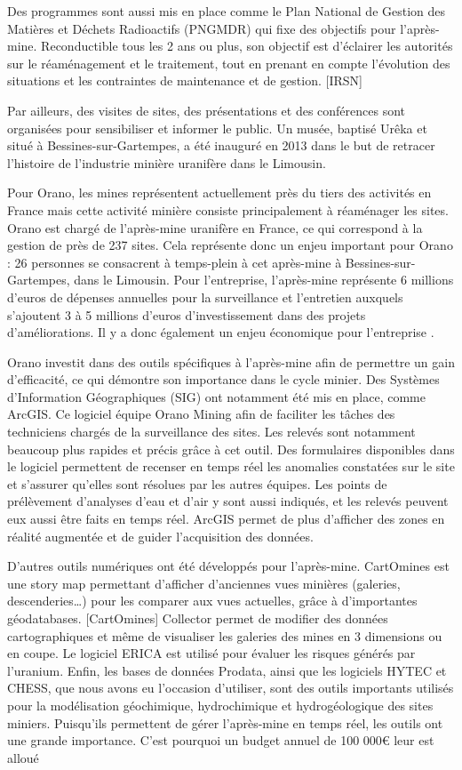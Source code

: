 \documentclass{article}
\begin{document}
Des programmes sont aussi mis en place comme le Plan National de Gestion des Matières et Déchets Radioactifs (PNGMDR) qui fixe des objectifs pour l’après-mine. Reconductible tous les 2 ans ou plus, son objectif est d’éclairer les autorités sur le réaménagement et le traitement, tout en prenant en compte l’évolution des situations et les contraintes de maintenance et de gestion.  [IRSN]

Par ailleurs, des visites de sites, des présentations et des conférences sont organisées pour sensibiliser et informer le public. Un musée, baptisé Urêka et situé à Bessines-sur-Gartempes, a été inauguré en 2013 dans le but de retracer l’histoire de l’industrie minière uranifère dans le Limousin.

Pour Orano, les mines représentent actuellement près du tiers des activités en France mais cette activité minière consiste principalement à réaménager les sites. Orano est chargé de l’après-mine uranifère en France, ce qui correspond à la gestion de près de 237 sites. Cela représente donc un enjeu important pour Orano : 26 personnes se consacrent à temps-plein à cet après-mine à Bessines-sur-Gartempes, dans le Limousin. Pour l’entreprise, l’après-mine représente 6 millions d’euros de dépenses annuelles pour la surveillance et l’entretien auxquels s’ajoutent 3 à 5 millions d’euros d’investissement dans des projets d’améliorations. Il y a donc également un enjeu économique pour l’entreprise \cite{himeur_apres-mine_2020}. 

Orano investit dans des outils spécifiques à l’après-mine afin de permettre un gain d’efficacité, ce qui démontre son importance dans le cycle minier. Des Systèmes d’Information Géographiques (SIG) ont notamment été mis en place, comme ArcGIS. Ce logiciel équipe Orano Mining afin de faciliter les tâches des techniciens chargés de la surveillance des sites. Les relevés sont notamment beaucoup plus rapides et précis grâce à cet outil. Des formulaires disponibles dans le logiciel permettent de recenser en temps réel les anomalies constatées sur le site et s’assurer qu’elles sont résolues par les autres équipes. Les points de prélèvement d’analyses d’eau et d’air y sont aussi indiqués, et les relevés peuvent eux aussi être faits en temps réel. ArcGIS permet de plus d’afficher des zones en réalité augmentée et de guider l’acquisition des données. 

D’autres outils numériques ont été développés pour l’après-mine. CartOmines est une story map permettant d’afficher d’anciennes vues minières (galeries, descenderies…) pour les comparer aux vues actuelles, grâce à d’importantes géodatabases. [CartOmines] Collector permet de modifier des données cartographiques et même de visualiser les galeries des mines en 3 dimensions ou en coupe. Le logiciel ERICA est utilisé pour évaluer les risques générés par l’uranium. Enfin, les bases de données Prodata, ainsi que les logiciels HYTEC et CHESS, que nous avons eu l’occasion d’utiliser, sont des outils importants utilisés pour la modélisation géochimique, hydrochimique et hydrogéologique des sites miniers. Puisqu’ils permettent de gérer l’après-mine en temps réel, les outils ont une grande importance. C’est pourquoi un budget annuel de 100 000€ leur est alloué %
\end{document}
